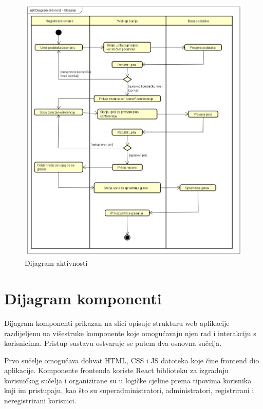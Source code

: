			\begin{figure}[H]
				\includegraphics[scale=0.4]{dijagrami/dijagram_aktivnosti.png}%
			 	\centering
			 	\caption{Dijagram aktivnosti}
			 	\label{fig:promjene8.1}
			 \end{figure}
			 
			
			\eject
		\section{Dijagram komponenti}
		
			 Dijagram komponenti prikazan na slici opisuje strukturu web aplikacije razdijeljenu na višestruke komponente koje omogućavaju njen rad i interakciju s korisnicima. Pristup sustavu ostvaruje se putem dva osnovna sučelja.
			 
			 Prvo sučelje omogućava dohvat HTML, CSS i JS datoteka koje čine frontend dio aplikacije. Komponente frontenda koriste React biblioteku za izgradnju korisničkog sučelja i organizirane su u logičke cjeline prema tipovima korisnika koji im pristupaju, kao što su superadministratori, administratori, registrirani i neregistrirani korisnici.
			 
